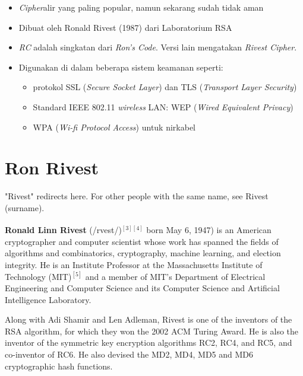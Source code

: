 \documentclass{article}
\begin{document}
\begin{itemize}
    \item \textit{Cipher}alir yang paling popular, namun sekarang sudah tidak aman
    \item Dibuat oleh Ronald Rivest (1987) dari Laboratorium RSA
    \item \textit{RC} adalah singkatan dari \textit{Ron's Code}. Versi lain mengatakan \textit{Rivest Cipher}.
    \item Digunakan di dalam beberapa sistem keamanan seperti:
    \begin{itemize}
        \item protokol SSL (\textit{Secure Socket Layer}) dan TLS (\textit{Transport Layer Security})
        \item Standard IEEE 802.11 \textit{wireless} LAN: WEP (\textit{Wired Equivalent Privacy})
        \item WPA (\textit{Wi-fi Protocol Access}) untuk nirkabel
    \end{itemize}
\end{itemize}

\newpage


\section*{Ron Rivest}

"Rivest" redirects here. For other people with the same name, see Rivest (surname).

\vspace{193.05mm}

\textbf{Ronald Linn Rivest} (/r\textsuperscript{\textregistered}vest/)$^{[3][4]}$ born May 6, 1947) is an American cryptographer and computer scientist whose work has spanned the fields of algorithms and combinatorics, cryptography, machine learning, and election integrity. He is an Institute Professor at the Massachusetts Institute of Technology (MIT)$^{[5]}$ and a member of MIT's Department of Electrical Engineering and Computer Science and its Computer Science and Artificial Intelligence Laboratory.

\vspace{50mm}

Along with Adi Shamir and Len Adleman, Rivest is one of the inventors of the RSA algorithm, for which they won the 2002 ACM Turing Award. He is also the inventor of the symmetric key encryption algorithms RC2, RC4, and RC5, and co-inventor of RC6. He also devised the MD2, MD4, MD5 and MD6 cryptographic hash functions.
\end{document}
